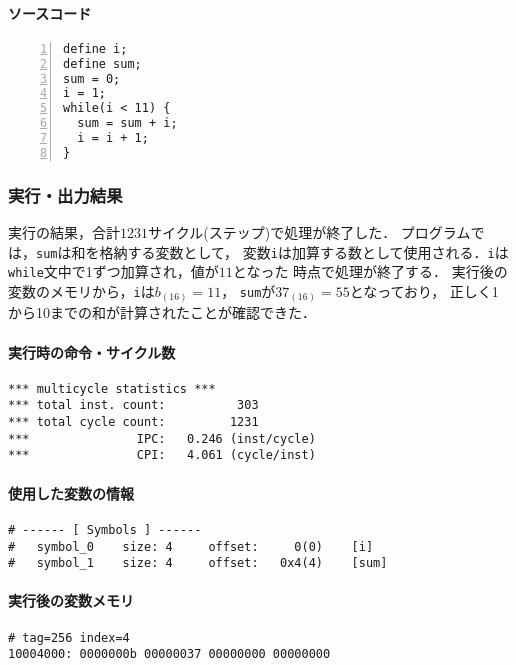 \paragraph*{ソースコード}

\begin{Verbatim}[numbers=left, xleftmargin=10mm, numbersep=6pt, frame=single,
                    fontsize=\small, baselinestretch=0.8]
define i;
define sum;
sum = 0;
i = 1;
while(i < 11) {
  sum = sum + i;
  i = i + 1;
}
\end{Verbatim}

\subsubsection{実行・出力結果}
実行の結果，合計$1231$サイクル(ステップ)で処理が終了した．
プログラムでは，\verb|sum|は和を格納する変数として，
変数\verb|i|は加算する数として使用される．\verb|i|は
\verb|while|文中で1ずつ加算され，値が$11$となった
時点で処理が終了する．
実行後の変数のメモリから，\verb|i|は$b_{(16)} = 11$，
\verb|sum|が$37_{(16)} = 55$となっており，
正しく1から10までの和が計算されたことが確認できた．

\paragraph*{実行時の命令・サイクル数}

\begin{Verbatim}[numbers=none, frame=single,
fontsize=\small, baselinestretch=0.8]
*** multicycle statistics ***
*** total inst. count:          303
*** total cycle count:         1231
***               IPC:   0.246 (inst/cycle)
***               CPI:   4.061 (cycle/inst)  
\end{Verbatim}

\paragraph*{使用した変数の情報}
\begin{Verbatim}[numbers=none, frame=single,
  fontsize=\small, baselinestretch=0.8]
# ------ [ Symbols ] ------
# 	symbol_0 	size: 4 	offset:     0(0) 	[i]
# 	symbol_1 	size: 4 	offset:   0x4(4) 	[sum]
\end{Verbatim}

\paragraph*{実行後の変数メモリ}
\begin{Verbatim}[numbers=none, frame=single,
  fontsize=\small, baselinestretch=0.8]
# tag=256 index=4
10004000: 0000000b 00000037 00000000 00000000
\end{Verbatim}

